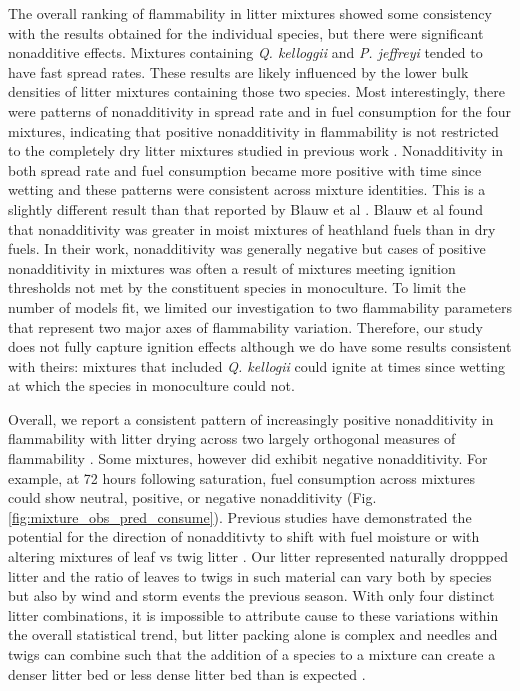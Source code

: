 \documentclass[letterpaper,12pt]{article}
\begin{document}
The overall ranking of flammability in litter mixtures showed some consistency
with the results obtained for the individual species, but there were
significant nonadditive effects. Mixtures containing \emph{Q. kelloggii} and
\emph{P. jeffreyi} tended to have fast spread rates. These results are likely
influenced by the lower bulk densities of litter mixtures containing those two
species. Most interestingly, there were patterns of nonadditivity in spread
rate and in fuel consumption for the four mixtures, indicating that positive
nonadditivity in flammability is not restricted to the completely dry litter
mixtures studied in previous work \citep{Magalhaes+Schwilk-2012,
  VanAltena+Logtestjin+etal-2012}. Nonadditivity in both spread rate and fuel
consumption became more positive with time since wetting and these patterns
were consistent across mixture identities. This is a slightly different result
than that reported by Blauw et al \citeyear{Blauw+Wensink+etal-2015}. Blauw et
al found that nonadditivity was greater in moist mixtures of heathland fuels
than in dry fuels. In their work, nonadditivity was generally negative but
cases of positive nonadditivity in mixtures was often a result of mixtures
meeting ignition thresholds not met by the constituent species in monoculture.
To limit the number of models fit, we limited our investigation to two
flammability parameters that represent two major axes of flammability
variation. Therefore, our study does not fully capture ignition effects
although we do have some results consistent with theirs: mixtures that included
\emph{Q. kellogii} could ignite at times since wetting at which the species in
monoculture could not.

Overall, we report a consistent pattern of increasingly positive nonadditivity
in flammability with litter drying across two largely orthogonal measures of
flammability \citep{Schwilk-2015, Pausas+Keeley+etal-2017,
  Prior+Murphy+etal-2018}. Some mixtures, however did exhibit negative
nonadditivity. For example, at 72 hours following saturation, fuel consumption
across mixtures could show neutral, positive, or negative nonadditivity (Fig.
\ref{fig:mixture_obs_pred_consume}). Previous studies have demonstrated the
potential for the direction of nonadditivty to shift with fuel moisture
\citep{Blauw+Wensink+etal-2015} or with altering mixtures of leaf vs twig
litter \citep{Zhao+vanLogtestijn+etal-2019}. Our litter represented naturally
droppped litter and the ratio of leaves to twigs in such material can vary both
by species but also by wind and storm events the previous season. With only
four distinct litter combinations, it is impossible to attribute cause to these
variations within the overall statistical trend, but litter packing alone is
complex and needles and twigs can combine such that the addition of a species
to a mixture can create a denser litter bed or less dense litter bed than is
expected \citep{Zhao+vanLogtestijn+etal-2019}.
\end{document}
